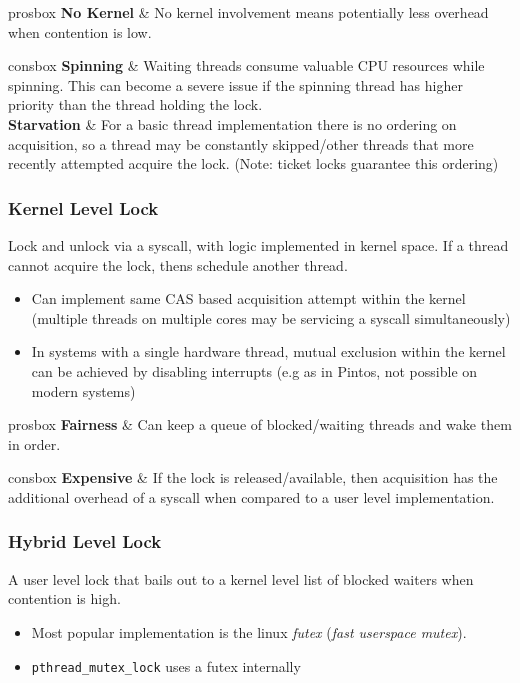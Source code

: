\begin{tabbox}{prosbox}
    \textbf{No Kernel} & No kernel involvement means potentially less overhead when contention is low. \\
\end{tabbox}

\begin{tabbox}{consbox}
    \textbf{Spinning} & Waiting threads consume valuable CPU resources while spinning. This can become a severe issue if the spinning thread has higher priority than the thread holding the lock. \\
    \textbf{Starvation} & For a basic thread implementation there is no ordering on acquisition, so a thread may be constantly skipped/other threads that more recently attempted acquire the lock.  (Note: ticket locks guarantee this ordering) \\ 
\end{tabbox}

\subsubsection{Kernel Level Lock}
Lock and unlock via a syscall, with logic implemented in kernel space. If a thread cannot acquire the lock, thens schedule another thread.  
\begin{itemize}
    \item Can implement same CAS based acquisition attempt within the kernel (multiple threads on multiple cores may be servicing a syscall simultaneously)
    \item In systems with a single hardware thread, mutual exclusion within the kernel can be achieved by disabling interrupts (e.g as in Pintos, not possible on modern systems)
\end{itemize}

\begin{tabbox}{prosbox}
    \textbf{Fairness} & Can keep a queue of blocked/waiting threads and wake them in order. \\ 
\end{tabbox}
\begin{tabbox}{consbox}
    \textbf{Expensive} & If the lock is released/available, then acquisition has the additional overhead of a syscall when compared to a user level implementation. \\ 
\end{tabbox}

\subsubsection{Hybrid Level Lock}
A user level lock that bails out to a kernel level list of blocked waiters when contention is high.
\begin{itemize}
    \item Most popular implementation is the linux \textit{futex} (\textit{fast userspace mutex}).
    \item \texttt{pthread_mutex_lock} uses a futex internally
\end{itemize}

